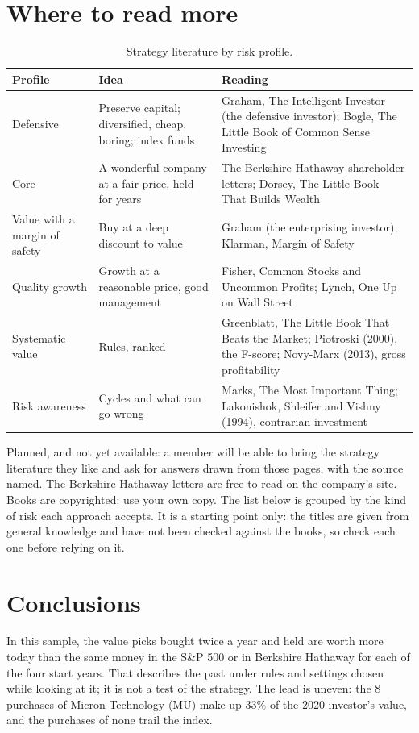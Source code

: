 \documentclass[11pt,a4paper]{article}
\begin{document}
\section{Where to read more}
\label{sec:reading}
\begin{table}[H]
\centering
\small
\caption{Strategy literature by risk profile.}\label{tab:reading}
\begin{tabular}{l p{4.5cm} p{5.6cm}}
\hline
Profile & Idea & Reading \\
\hline
Defensive & Preserve capital; diversified, cheap, boring; index funds & Graham, The Intelligent Investor (the defensive investor); Bogle, The Little Book of Common Sense Investing \\
Core & A wonderful company at a fair price, held for years & The Berkshire Hathaway shareholder letters; Dorsey, The Little Book That Builds Wealth \\
Value with a margin of safety & Buy at a deep discount to value & Graham (the enterprising investor); Klarman, Margin of Safety \\
Quality growth & Growth at a reasonable price, good management & Fisher, Common Stocks and Uncommon Profits; Lynch, One Up on Wall Street \\
Systematic value & Rules, ranked & Greenblatt, The Little Book That Beats the Market; Piotroski (2000), the F-score; Novy-Marx (2013), gross profitability \\
Risk awareness & Cycles and what can go wrong & Marks, The Most Important Thing; Lakonishok, Shleifer and Vishny (1994), contrarian investment \\
\hline
\end{tabular}
\end{table}
Planned, and not yet available: a member will be able to bring the strategy literature they like and ask for answers drawn from those pages, with the source named. The Berkshire Hathaway letters are free to read on the company's site. Books are copyrighted: use your own copy. The list below is grouped by the kind of risk each approach accepts. It is a starting point only: the titles are given from general knowledge and have not been checked against the books, so check each one before relying on it.

\section{Conclusions}
In this sample, the value picks bought twice a year and held are worth more today than the same money in the S\&P 500 or in Berkshire Hathaway for each of the four start years. That describes the past under rules and settings chosen while looking at it; it is not a test of the strategy. The lead is uneven: the 8 purchases of Micron Technology (MU) make up 33\% of the 2020 investor's value, and the purchases of none trail the index.
\end{document}
